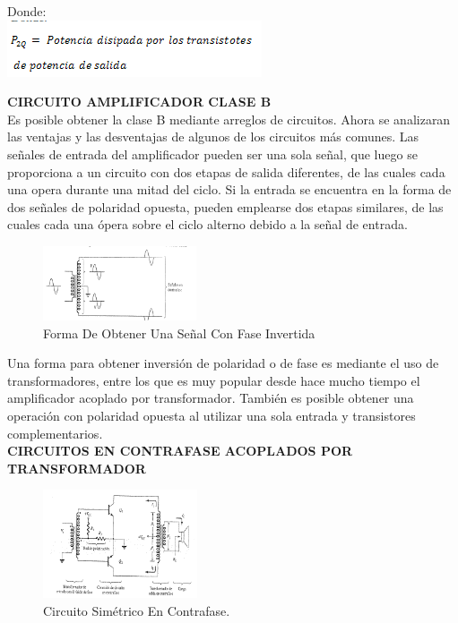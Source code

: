 \documentclass[10pt,a4paper]{article}
\begin{document}
Donde:\\
\includegraphics[scale=0.5]{19.png}

\textbf{CIRCUITO AMPLIFICADOR CLASE B}\\
Es posible obtener la clase B mediante arreglos de circuitos. Ahora se analizaran las ventajas y las desventajas de algunos de los circuitos más comunes. Las señales de entrada del amplificador pueden ser una sola señal, que luego se proporciona a un circuito con dos etapas de salida diferentes, de las cuales cada una opera durante una mitad del ciclo. Si la entrada se encuentra en la forma de dos señales de polaridad opuesta, pueden emplearse dos etapas similares, de las cuales cada una ópera sobre el ciclo alterno debido a la señal de entrada.\\
\begin{center}
\begin{figure}[hbtp]
\centering
\includegraphics[scale=0.5]{20.png}
\caption{Forma De Obtener Una Señal Con Fase Invertida}
\end{figure}
\end{center}

Una forma para obtener inversión de polaridad o de fase es mediante el uso de transformadores, entre los que es muy popular desde hace mucho tiempo el amplificador acoplado por transformador. También es posible obtener una operación con polaridad opuesta al utilizar una sola entrada y transistores complementarios.\\
\textbf{CIRCUITOS EN CONTRAFASE ACOPLADOS POR TRANSFORMADOR}\\
\begin{center}
\begin{figure}[hbtp]
\centering
\includegraphics[scale=0.5]{21.png}
\caption{ Circuito Simétrico En Contrafase.}
\end{figure}
\end{center}
\end{document}
